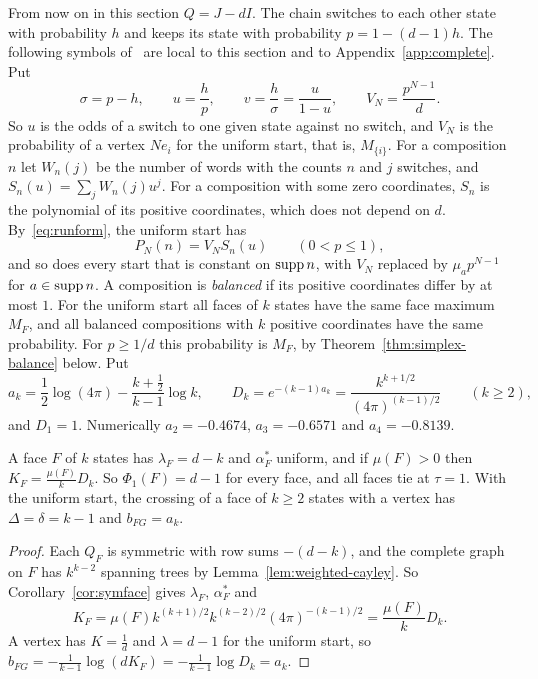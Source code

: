 From now on in this section $Q=J-dI$. The chain switches to each other state with
probability $h$ and keeps its state with probability $p=1-(d-1)h$. The
following symbols of~\cite{paperB} are local to this section and to
Appendix~\ref{app:complete}. Put
\[
\sigma=p-h,\qquad u=\frac hp,\qquad v=\frac h\sigma=\frac u{1-u},\qquad
V_N=\frac{p^{N-1}}d .
\]
So $u$ is the odds of a switch to one given state against no switch, and $V_N$ is the
probability of a vertex $Ne_i$ for the uniform start, that is, $M_{\{i\}}$. For a composition
$n$ let $W_n(j)$ be the number of words with the counts $n$ and $j$ switches, and
$S_n(u)=\sum_jW_n(j)u^j$. For a
composition with some zero coordinates, $S_n$ is the polynomial of its positive coordinates,
which does not depend on $d$. By~\eqref{eq:runform}, the uniform start has
\begin{equation}\label{eq:SnVN}
P_N(n)=V_NS_n(u)\qquad(0<p\le1),
\end{equation}
and so does every start that is constant on $\operatorname{supp} n$, with $V_N$ replaced by
$\mu_ap^{N-1}$ for $a\in\operatorname{supp} n$. A composition is \emph{balanced} if its positive coordinates
differ by at most $1$. For the uniform start all faces of $k$ states have the same face maximum
$M_F$, and all balanced compositions with $k$ positive coordinates have the same probability. For
$p\ge1/d$ this probability is $M_F$, by Theorem~\ref{thm:simplex-balance} below. Put
\[
a_k=\frac12\log(4\pi)-\frac{k+\frac12}{k-1}\log k,\qquad
D_k=e^{-(k-1)a_k}=\frac{k^{k+1/2}}{(4\pi)^{(k-1)/2}}\qquad(k\ge2),
\]
and $D_1=1$. Numerically $a_2=-0.4674$, $a_3=-0.6571$ and $a_4=-0.8139$.

\begin{corollary}\label{cor:paperB}
A face $F$ of $k$ states has $\lambda_F=d-k$ and $\alpha^*_F$ uniform, and if $\mu(F)>0$ then
$K_F=\frac{\mu(F)}kD_k$. So $\Phi_1(F)=d-1$ for every face, and all faces tie at $\tau=1$. With
the uniform start, the crossing of a face of $k\ge2$ states with a vertex has
$\Delta=\delta=k-1$ and $b_{FG}=a_k$.
\end{corollary}

\begin{proof}
Each $Q_F$ is symmetric with row sums $-(d-k)$, and the complete graph on $F$ has $k^{k-2}$
spanning trees by Lemma~\ref{lem:weighted-cayley}. So Corollary~\ref{cor:symface} gives
$\lambda_F$, $\alpha^*_F$ and
\[
K_F=\mu(F)k^{(k+1)/2}k^{(k-2)/2}(4\pi)^{-(k-1)/2}=\frac{\mu(F)}kD_k.
\]
A vertex has $K=\frac1d$ and $\lambda=d-1$ for the uniform start, so
$b_{FG}=-\frac1{k-1}\log(dK_F)=-\frac1{k-1}\log D_k=a_k$.
\end{proof}

